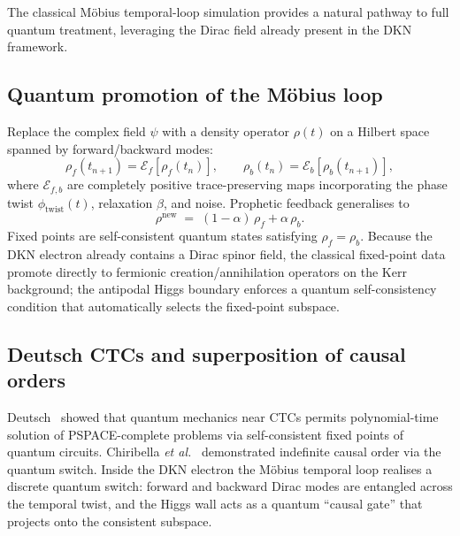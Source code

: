 \documentclass[11pt,a4paper]{article}
\theoremstyle{definition}
\theoremstyle{remark}
\newcommand{\phitwist}{\phi_{\mathrm{twist}}}
\begin{document}
The classical M\"obius temporal-loop simulation provides a natural
pathway to full quantum treatment, leveraging the Dirac field already
present in the DKN framework.

\subsection{Quantum promotion of the M\"obius loop}
Replace the complex field $\psi$ with a density operator $\rho(t)$ on a
Hilbert space spanned by forward/backward modes:
\begin{equation}\label{eq:cptp}
  \rho_f(t_{n+1}) = \mathcal{E}_f[\rho_f(t_n)],\qquad
  \rho_b(t_n)   = \mathcal{E}_b[\rho_b(t_{n+1})],
\end{equation}
where $\mathcal{E}_{f,b}$ are completely positive trace-preserving maps
incorporating the phase twist $\phitwist(t)$, relaxation $\beta$, and
noise. Prophetic feedback generalises to
\begin{equation}\label{eq:rho-mix}
  \rho^{\mathrm{new}} \;=\; (1-\alpha)\,\rho_f + \alpha\,\rho_b.
\end{equation}
Fixed points are self-consistent quantum states satisfying
$\rho_f = \rho_b$. Because the DKN electron already contains a Dirac
spinor field, the classical fixed-point data promote directly to
fermionic creation/annihilation operators on the Kerr background; the
antipodal Higgs boundary enforces a quantum self-consistency condition
that automatically selects the fixed-point subspace.

\subsection{Deutsch CTCs and superposition of causal orders}
Deutsch~\cite{Deutsch1991} showed that quantum mechanics near CTCs
permits polynomial-time solution of PSPACE-complete problems via
self-consistent fixed points of quantum circuits.
Chiribella \emph{et al.}~\cite{Chiribella2013} demonstrated indefinite
causal order via the quantum switch. Inside the DKN electron the
M\"obius temporal loop realises a discrete quantum switch: forward
and backward Dirac modes are entangled across the
temporal twist, and the Higgs wall acts as a quantum ``causal gate''
that projects onto the consistent subspace.
\end{document}
